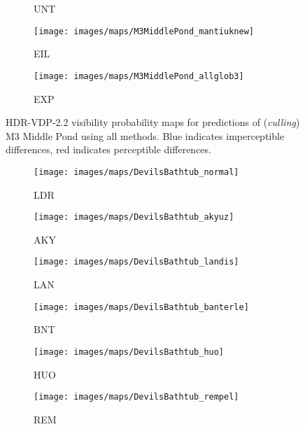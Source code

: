 \documentclass{egpubl}
\begin{document}
\begin{figure*}[htb]
\begin{subfigure}[t]{0.13\linewidth}
        \caption{UNT}
    \end{subfigure}
    \begin{subfigure}[t]{0.13\linewidth}
        \centering
        \texttt{[image: images/maps/M3MiddlePond\_mantiuknew]}
        \caption{EIL}
    \end{subfigure}
    \begin{subfigure}[t]{0.13\linewidth}
        \centering
        \texttt{[image: images/maps/M3MiddlePond\_allglob3]}
        \caption{EXP}
    \end{subfigure}
    \caption{HDR-VDP-2.2 visibility probability maps for predictions of
    (\textit{culling}) M3 Middle Pond using all methods. Blue indicates
    imperceptible differences, red indicates perceptible
    differences.}\label{fig:mapsgood}
\end{figure*} \begin{figure*}[htb]
    \centering
    \begin{subfigure}[t]{0.13\linewidth}
        \centering
        \texttt{[image: images/maps/DevilsBathtub\_normal]}
        \caption{LDR}
    \end{subfigure}
    \begin{subfigure}[t]{0.13\linewidth}
        \centering
        \texttt{[image: images/maps/DevilsBathtub\_akyuz]}
        \caption{AKY}
    \end{subfigure}
    \begin{subfigure}[t]{0.13\linewidth}
        \centering
        \texttt{[image: images/maps/DevilsBathtub\_landis]}
        \caption{LAN}
    \end{subfigure}
    \begin{subfigure}[t]{0.13\linewidth}
        \centering
        \texttt{[image: images/maps/DevilsBathtub\_banterle]}
        \caption{BNT}
    \end{subfigure}
    \begin{subfigure}[t]{0.13\linewidth}
        \centering
        \texttt{[image: images/maps/DevilsBathtub\_huo]}
        \caption{HUO}
    \end{subfigure}
    \begin{subfigure}[t]{0.13\linewidth}
        \centering
        \texttt{[image: images/maps/DevilsBathtub\_rempel]}
        \caption{REM}
    \end{subfigure}\\
    \begin{subfigure}[t]{0.13\linewidth}

\end{subfigure}
\end{figure*}
\end{document}

